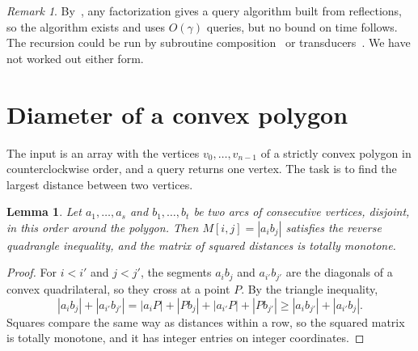 \documentclass[11pt]{article}
\newtheorem{lemma}[theorem]{Lemma}
\theoremstyle{definition}
\theoremstyle{remark}
\newtheorem{remark}[theorem]{Remark}
\begin{document}
\begin{remark}
By~\cite{LMRSS11}, any factorization gives a query algorithm built from reflections, so the algorithm exists and uses $O(\gamma)$ queries, but no bound on time follows. The recursion could be run by subroutine composition~\cite{Jef22} or transducers~\cite{BJY23}. We have not worked out either form.
\end{remark}

\section{Diameter of a convex polygon}\label{sec:polygon}

The input is an array with the vertices $v_0,\dots,v_{n-1}$ of a strictly convex polygon in counterclockwise order, and a query returns one vertex. The task is to find the largest distance between two vertices.

\begin{lemma}\label{lem:arc}
Let $a_1,\dots,a_s$ and $b_1,\dots,b_t$ be two arcs of consecutive vertices, disjoint, in this order around the polygon. Then $M[i,j]=|a_ib_j|$ satisfies the reverse quadrangle inequality, and the matrix of squared distances is totally monotone.
\end{lemma}
\begin{proof}
For $i<i'$ and $j<j'$, the segments $a_ib_j$ and $a_{i'}b_{j'}$ are the diagonals of a convex quadrilateral, so they cross at a point $P$. By the triangle inequality,
\[
|a_ib_j|+|a_{i'}b_{j'}|=|a_iP|+|Pb_j|+|a_{i'}P|+|Pb_{j'}|\ge|a_ib_{j'}|+|a_{i'}b_j|.
\]
Squares compare the same way as distances within a row, so the squared matrix is totally monotone, and it has integer entries on integer coordinates.
\end{proof}
\end{document}
